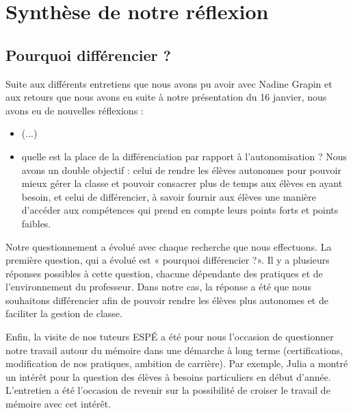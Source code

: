 \section{Synthèse de notre réflexion}


\subsection{Pourquoi différencier ?}


Suite aux différents entretiens que nous avons pu avoir avec Nadine Grapin et aux retours que nous avons eu suite à notre présentation du 16 janvier, nous avons eu de nouvelles réflexions :
\begin{itemize}
    \item (...)
    \item quelle est la place de la différenciation par rapport à l’autonomisation ? Nous avons un double objectif : celui de rendre les élèves autonomes pour pouvoir mieux gérer la classe et pouvoir consacrer plus de temps aux élèves en ayant besoin, et celui de différencier, à savoir fournir aux élèves une manière d’accéder aux compétences qui prend en compte leurs points forts et points faibles.
\end{itemize}

Notre questionnement a évolué avec chaque recherche que nous effectuons. La première question, qui a évolué est « pourquoi différencier ?». Il y a plusieurs réponses possibles à cette question, chacune dépendante des pratiques et de l’environnement du professeur. Dans notre cas, la réponse a été que nous souhaitons différencier afin de pouvoir rendre les élèves plus autonomes et de faciliter la gestion de classe.

Enfin, la visite de nos tuteurs ESPÉ a été pour nous l’occasion de questionner notre travail autour du mémoire dans une démarche à long terme (certifications, modification de nos pratiques, ambition de carrière). Par exemple, Julia a montré un intérêt pour la question des élèves à besoins particuliers en début d’année. L’entretien a été l’occasion de revenir sur la possibilité de croiser le travail de mémoire avec cet intérêt. 

